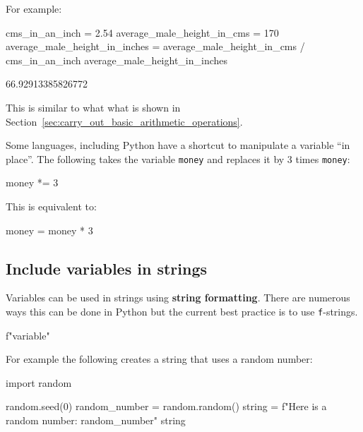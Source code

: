 For example:





\begin{pyin}
cms_in_an_inch = 2.54
average_male_height_in_cms = 170
average_male_height_in_inches = average_male_height_in_cms / cms_in_an_inch
average_male_height_in_inches
\end{pyin}





\begin{raw}
66.92913385826772
\end{raw}







This is similar to what what is shown in Section~\ref{sec:carry_out_basic_arithmetic_operations}.

Some languages, including Python have a shortcut to manipulate a variable “in
place”. The following takes the variable \texttt{money} and replaces it by 3 times
\texttt{money}:

\begin{pyin}
money *= 3
\end{pyin}


This is equivalent to:

\begin{pyin}
money = money * 3
\end{pyin}


\subsection{Include variables in strings}

Variables can be used in strings using \textbf{string formatting}. There are numerous
ways this can be done in Python but the current best practice is to use
\texttt{f}-strings.


\begin{api}
f"{variable}"
\end{api}



For example the following creates a string that uses a random number:




\begin{pyin}
import random

random.seed(0)
random_number = random.random()
string = f"Here is a random number: {random_number}"
string
\end{pyin}





